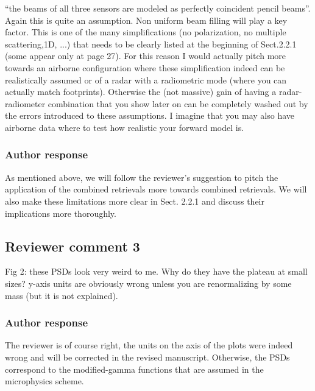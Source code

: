 \documentclass[11pt]{scrartcl}
\begin{document}
 “the beams of all three sensors are modeled as perfectly coincident pencil
beams”. Again this is quite an assumption. Non uniform beam filling will play a
key factor. This is one of the many simplifications (no polarization, no multiple
scattering,1D, ...) that needs to be clearly listed at the beginning of
Sect.2.2.1 (some appear only at page 27). For this reason I would actually pitch
more towards an airborne configuration where these simplification indeed can
be realistically assumed or of a radar with a radiometric mode (where you can
actually match footprints). Otherwise the (not massive) gain of having a
radar-radiometer combination that you show later on can be completely washed
out by the errors introduced to these assumptions. I imagine that you may also
have airborne data where to test how realistic your forward model is.

\subsubsection*{Author response}


As mentioned above, we will follow the reviewer's suggestion to pitch the application
of the combined retrievals more towards combined retrievals. We will also make these
limitations more clear in Sect. 2.2.1 and discuss their implications more thoroughly.

\subsection*{Reviewer comment 3}
Fig 2: these PSDs look very weird to me. Why do they have the plateau at small
sizes? y-axis units are obviously wrong unless you are renormalizing by some mass
(but it is not explained).

\subsubsection*{Author response}

The reviewer is of course right, the units on the axis of the plots were indeed
wrong and will be corrected in the revised manuscript. Otherwise, the PSDs
correspond to the modified-gamma functions that are assumed in the
\cite{milbrandtyau05} microphysics scheme.
\end{document}
